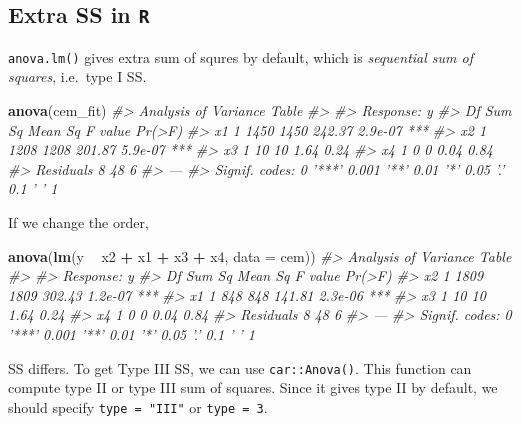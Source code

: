 \documentclass[]{book}
\newenvironment{Shaded}{\begin{snugshade}}{\end{snugshade}}
\newcommand{\CommentTok}[1]{\textcolor[rgb]{0.56,0.35,0.01}{\textit{#1}}}
\newcommand{\DataTypeTok}[1]{\textcolor[rgb]{0.13,0.29,0.53}{#1}}
\newcommand{\KeywordTok}[1]{\textcolor[rgb]{0.13,0.29,0.53}{\textbf{#1}}}
\newcommand{\NormalTok}[1]{#1}
\newcommand{\OperatorTok}[1]{\textcolor[rgb]{0.81,0.36,0.00}{\textbf{#1}}}
\newcommand{\StringTok}[1]{\textcolor[rgb]{0.31,0.60,0.02}{#1}}
\theoremstyle{definition}
\theoremstyle{definition}
\theoremstyle{definition}
\theoremstyle{remark}
\begin{document}
\hypertarget{extra-ss-in-r}{%
\subsection{\texorpdfstring{Extra SS in \texttt{R}}{Extra SS in R}}\label{extra-ss-in-r}}

\texttt{anova.lm()} gives extra sum of squres by default, which is \emph{sequential sum of squares}, i.e.~type I SS.

\begin{Shaded}
\begin{Highlighting}[]
\KeywordTok{anova}\NormalTok{(cem_fit)}
\CommentTok{#> Analysis of Variance Table}
\CommentTok{#> }
\CommentTok{#> Response: y}
\CommentTok{#>           Df Sum Sq Mean Sq F value  Pr(>F)    }
\CommentTok{#> x1         1   1450    1450  242.37 2.9e-07 ***}
\CommentTok{#> x2         1   1208    1208  201.87 5.9e-07 ***}
\CommentTok{#> x3         1     10      10    1.64    0.24    }
\CommentTok{#> x4         1      0       0    0.04    0.84    }
\CommentTok{#> Residuals  8     48       6                    }
\CommentTok{#> ---}
\CommentTok{#> Signif. codes:  0 '***' 0.001 '**' 0.01 '*' 0.05 '.' 0.1 ' ' 1}
\end{Highlighting}
\end{Shaded}

If we change the order,

\begin{Shaded}
\begin{Highlighting}[]
\KeywordTok{anova}\NormalTok{(}\KeywordTok{lm}\NormalTok{(y }\OperatorTok{~}\StringTok{ }\NormalTok{x2 }\OperatorTok{+}\StringTok{ }\NormalTok{x1 }\OperatorTok{+}\StringTok{ }\NormalTok{x3 }\OperatorTok{+}\StringTok{ }\NormalTok{x4, }\DataTypeTok{data =}\NormalTok{ cem))}
\CommentTok{#> Analysis of Variance Table}
\CommentTok{#> }
\CommentTok{#> Response: y}
\CommentTok{#>           Df Sum Sq Mean Sq F value  Pr(>F)    }
\CommentTok{#> x2         1   1809    1809  302.43 1.2e-07 ***}
\CommentTok{#> x1         1    848     848  141.81 2.3e-06 ***}
\CommentTok{#> x3         1     10      10    1.64    0.24    }
\CommentTok{#> x4         1      0       0    0.04    0.84    }
\CommentTok{#> Residuals  8     48       6                    }
\CommentTok{#> ---}
\CommentTok{#> Signif. codes:  0 '***' 0.001 '**' 0.01 '*' 0.05 '.' 0.1 ' ' 1}
\end{Highlighting}
\end{Shaded}

SS differs. To get Type III SS, we can use \texttt{car::Anova()}. This function can compute type II or type III sum of squares. Since it gives type II by default, we should specify \texttt{type\ =\ "III"} or \texttt{type\ =\ 3}.
\end{document}
